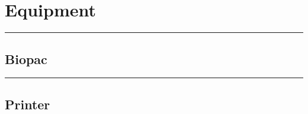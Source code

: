 \documentclass[]{book}
\begin{document}
\section{Equipment}\label{equipment}

\begin{center}\rule{0.5\linewidth}{0.5pt}\end{center}

\subsection{Biopac}\label{biopac}

\begin{center}\rule{0.5\linewidth}{0.5pt}\end{center}

\subsection{Printer}\label{printer}
\end{document}
